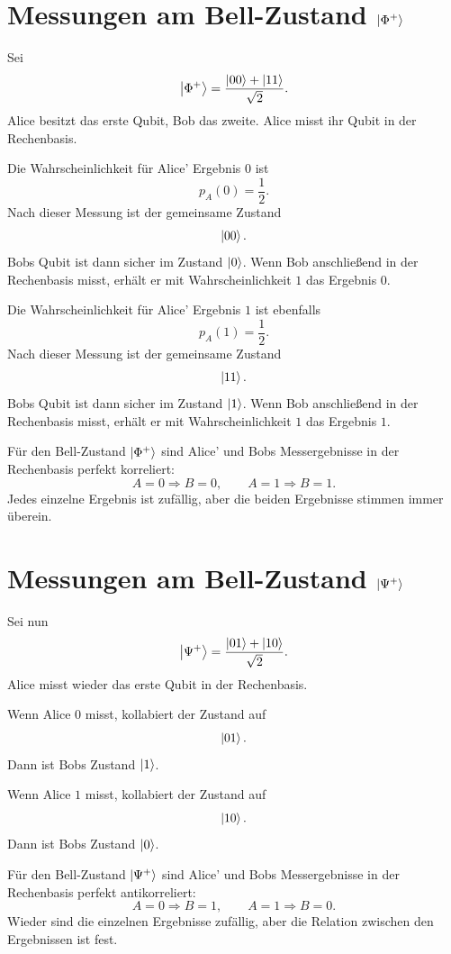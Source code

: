 \section{Messungen am Bell-Zustand \texorpdfstring{\(\left|\Phi^+\right\rangle\)}{Phi+}}

Sei
\[
    \left|\Phi^+\right\rangle=\frac{\left|00\right\rangle+\left|11\right\rangle}{\sqrt2}.
\]
Alice besitzt das erste Qubit, Bob das zweite. Alice misst ihr Qubit in der Rechenbasis.

Die Wahrscheinlichkeit für Alice' Ergebnis \(0\) ist
\[
    p_A(0)=\frac12.
\]
Nach dieser Messung ist der gemeinsame Zustand
\[
    \left|00\right\rangle.
\]
Bobs Qubit ist dann sicher im Zustand \(\left|0\right\rangle\). Wenn Bob anschließend in der Rechenbasis misst, erhält er mit Wahrscheinlichkeit \(1\) das Ergebnis \(0\).

Die Wahrscheinlichkeit für Alice' Ergebnis \(1\) ist ebenfalls
\[
    p_A(1)=\frac12.
\]
Nach dieser Messung ist der gemeinsame Zustand
\[
    \left|11\right\rangle.
\]
Bobs Qubit ist dann sicher im Zustand \(\left|1\right\rangle\). Wenn Bob anschließend in der Rechenbasis misst, erhält er mit Wahrscheinlichkeit \(1\) das Ergebnis \(1\).

\begin{answerbox}
Für den Bell-Zustand \(\left|\Phi^+\right\rangle\) sind Alice' und Bobs Messergebnisse in der Rechenbasis perfekt korreliert:
\[
    A=0 \Rightarrow B=0,
    \qquad
    A=1 \Rightarrow B=1.
\]
Jedes einzelne Ergebnis ist zufällig, aber die beiden Ergebnisse stimmen immer überein.
\end{answerbox}

\section{Messungen am Bell-Zustand \texorpdfstring{\(\left|\Psi^+\right\rangle\)}{Psi+}}

Sei nun
\[
    \left|\Psi^+\right\rangle=\frac{\left|01\right\rangle+\left|10\right\rangle}{\sqrt2}.
\]
Alice misst wieder das erste Qubit in der Rechenbasis.

Wenn Alice \(0\) misst, kollabiert der Zustand auf
\[
    \left|01\right\rangle.
\]
Dann ist Bobs Zustand \(\left|1\right\rangle\).

Wenn Alice \(1\) misst, kollabiert der Zustand auf
\[
    \left|10\right\rangle.
\]
Dann ist Bobs Zustand \(\left|0\right\rangle\).

\begin{answerbox}
Für den Bell-Zustand \(\left|\Psi^+\right\rangle\) sind Alice' und Bobs Messergebnisse in der Rechenbasis perfekt antikorreliert:
\[
    A=0 \Rightarrow B=1,
    \qquad
    A=1 \Rightarrow B=0.
\]
Wieder sind die einzelnen Ergebnisse zufällig, aber die Relation zwischen den Ergebnissen ist fest.
\end{answerbox}

